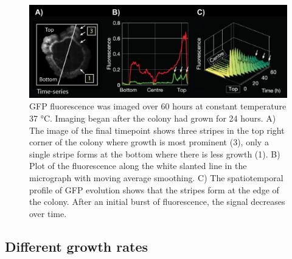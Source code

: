 \begin{figure}[H] %
    \centering
    \begin{adjustbox}{center}
        \includegraphics[width=1.1\textwidth]{chapters/Chapter 3/microscopy_timeseries} %
    \end{adjustbox}
    \caption{GFP fluorescence was imaged over 60 hours at constant temperature 37 °C. Imaging began after the colony had grown for 24 hours. A) The image of the final timepoint shows three stripes in the top right corner of the colony where growth is most prominent (3), only a single stripe forms at the bottom where there is less growth (1). B) Plot of the fluorescence along the white slanted line in the micrograph with moving average smoothing. C) The spatiotemporal profile of GFP evolution shows that the stripes form at the edge of the colony. After an initial burst of fluorescence, the signal decreases over time.}
    \label{fig:microscopy_timeseries}
\end{figure}

\subsection{Different growth rates}

